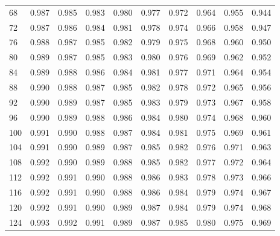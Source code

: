 \begin{table}
\begin{tabular}{lrrrrrrrrr}
68  &  0.987 &  0.985 &  0.983 &  0.980 &  0.977 &  0.972 &  0.964 &  0.955 &  0.944 \\
72  &  0.987 &  0.986 &  0.984 &  0.981 &  0.978 &  0.974 &  0.966 &  0.958 &  0.947 \\
76  &  0.988 &  0.987 &  0.985 &  0.982 &  0.979 &  0.975 &  0.968 &  0.960 &  0.950 \\
80  &  0.989 &  0.987 &  0.985 &  0.983 &  0.980 &  0.976 &  0.969 &  0.962 &  0.952 \\
84  &  0.989 &  0.988 &  0.986 &  0.984 &  0.981 &  0.977 &  0.971 &  0.964 &  0.954 \\
88  &  0.990 &  0.988 &  0.987 &  0.985 &  0.982 &  0.978 &  0.972 &  0.965 &  0.956 \\
92  &  0.990 &  0.989 &  0.987 &  0.985 &  0.983 &  0.979 &  0.973 &  0.967 &  0.958 \\
96  &  0.990 &  0.989 &  0.988 &  0.986 &  0.984 &  0.980 &  0.974 &  0.968 &  0.960 \\
100 &  0.991 &  0.990 &  0.988 &  0.987 &  0.984 &  0.981 &  0.975 &  0.969 &  0.961 \\
104 &  0.991 &  0.990 &  0.989 &  0.987 &  0.985 &  0.982 &  0.976 &  0.971 &  0.963 \\
108 &  0.992 &  0.990 &  0.989 &  0.988 &  0.985 &  0.982 &  0.977 &  0.972 &  0.964 \\
112 &  0.992 &  0.991 &  0.990 &  0.988 &  0.986 &  0.983 &  0.978 &  0.973 &  0.966 \\
116 &  0.992 &  0.991 &  0.990 &  0.988 &  0.986 &  0.984 &  0.979 &  0.974 &  0.967 \\
120 &  0.992 &  0.991 &  0.990 &  0.989 &  0.987 &  0.984 &  0.979 &  0.974 &  0.968 \\
124 &  0.993 &  0.992 &  0.991 &  0.989 &  0.987 &  0.985 &  0.980 &  0.975 &  0.969 \\
\bottomrule
\end{tabular}
\end{table}
